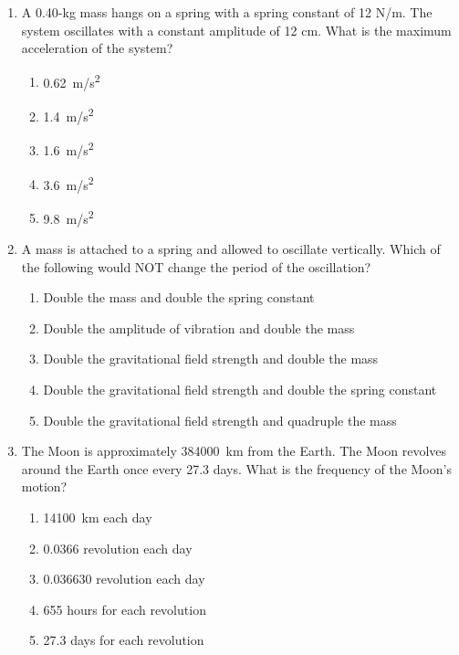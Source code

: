 \documentclass{../../../oss-apphys}
\begin{document}
\genheader


\genmultidirections

\gengravity

\raggedcolumns
\begin{multicols}{2}
  \begin{enumerate}[leftmargin=18pt]

  \item A 0.40-kg mass hangs on a spring with a spring constant of 12 N/m.
    The system oscillates with a constant amplitude of 12 cm. What is the
    maximum acceleration of the system?
    \begin{enumerate}[noitemsep,topsep=0pt,leftmargin=18pt,label=(\Alph*)]
    \item\SI{0.62}{m/s^2}
    \item\SI{1.4}{m/s^2}
    \item\SI{1.6}{m/s^2}
    \item\SI{3.6}{m/s^2}
    \item\SI{9.8}{m/s^2}
    \end{enumerate}

  \item A mass is attached to a spring and allowed to oscillate vertically.
    Which of the following would NOT change the period of the oscillation?
    \begin{enumerate}[noitemsep,topsep=0pt,leftmargin=18pt,label=(\Alph*)]
    \item Double the mass and double the spring constant
    \item Double the amplitude of vibration and double the mass
    \item Double the gravitational field strength and double the mass
    \item Double the gravitational field strength and double the spring constant
    \item Double the gravitational field strength and quadruple the mass
    \end{enumerate}
      
  \item The Moon is approximately \SI{384000}{\kilo\metre} from the Earth. The
    Moon revolves around the Earth once every 27.3 days. What is the frequency
    of the Moon's motion?
    \begin{enumerate}[noitemsep,topsep=0pt,leftmargin=18pt,label=(\Alph*)]
    \item \SI{14100}{km} each day
    \item 0.0366 revolution each day
    \item 0.036630 revolution each day
    \item 655 hours for each revolution
    \item 27.3 days for each revolution
    \end{enumerate}


\end{enumerate}
\end{multicols}
\end{document}
